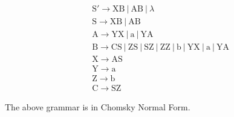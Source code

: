 \documentclass{report}
\begin{document}
{\begin{minipage}[t]{0.48\textwidth}
    \begin{equation*}
        \begin{aligned}
            &\mathrm{S'} \longrightarrow \mathrm{XB~|~AB~|~}\lambda\\
            &\mathrm{S} \longrightarrow \mathrm{XB~|~AB}\\
            &\mathrm{A} \longrightarrow \mathrm{YX~|~a~|~YA}\\
            &\mathrm{B} \longrightarrow \mathrm{CS~|~ZS~|~SZ~|~ZZ~|~b~|~YX~|~a~|~YA}\\
            &\mathrm{X} \longrightarrow \mathrm{AS}\\
            &\mathrm{Y} \longrightarrow \mathrm{a}\\
            &\mathrm{Z} \longrightarrow \mathrm{b}\\
            &\mathrm{C} \longrightarrow \mathrm{SZ}
        \end{aligned}
    \end{equation*}
\end{minipage}
The above grammar is in Chomsky Normal Form.
}
\end{document}

